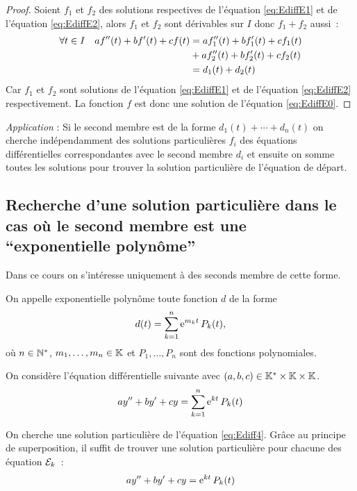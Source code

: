\begin{proof}
  Soient \(f_1\) et \(f_2\) des solutions respectives de l'équation 
  \eqref{eq:EdiffE1} et de l'équation \eqref{eq:EdiffE2}, alors \(f_1\) et 
  \(f_2\) sont dérivables sur \(I\) donc \(f_1 + f_2\) aussi~:
  \begin{align}
    \forall t \in I \quad af''(t) + bf'(t) + cf(t)& = af_1''(t) + bf_1'(t) + 
    cf_1(t) \notag \\
                                                  &+ af_2''(t) + bf_2'(t) + 
    cf_2(t)\\ & = d_1(t) + d_2(t)
  \end{align}
  Car \(f_1\) et \(f_2\) sont solutions de l'équation \eqref{eq:EdiffE1} et de 
  l'équation \eqref{eq:EdiffE2} respectivement. La fonction \(f\) est donc une 
  solution de l'équation \eqref{eq:EdiffE0}.
\end{proof}

\emph{Application} : Si le second membre est de la forme \(d_1(t)+ \dotsb  + 
d_n(t)\) on cherche indépendamment des solutions particulières \(f_i\) des 
équations différentielles correspondantes avec le second membre \(d_i\) et 
ensuite on somme toutes les solutions pour trouver la solution particulière de 
l'équation de départ.

\subsection{Recherche d'une solution particulière dans le cas où le second 
membre est une ``exponentielle polynôme''}
\label{subsec:recherchesolutionpartexppol}

Dans ce cours on s'intéresse uniquement à des seconds membre de cette forme.

\begin{defdef}
  On appelle exponentielle polynôme toute fonction \(d\) de la forme
  \begin{equation}
    d(t) = \sum_{k = 1}^{n} \operatorname{e}^{m_k t} P_k (t),
  \end{equation}
  où \(n \in \mathbb{N}^*\), \(m_1, \ldots, m_n \in \mathbb{K}\) et \( P_1, \ldots, P_n\) sont 
  des fonctions polynomiales.
\end{defdef}
On considère l'équation différentielle  suivante avec \((a,b,c) \in 
\mathbb{K}^{*}\times\mathbb{K}\times\mathbb{K}\).
\begin{equation}
  \label{eq:Ediff4}
  ay'' + by' + cy = \sum_{k = 1}^{n} \operatorname{e}^{kt} P_k(t)
\end{equation}

On cherche une solution particulière de l'équation \eqref{eq:Ediff4}. Grâce au 
principe de superposition, il suffit de trouver une solution particulière pour 
chacune des équation \(\mathcal{E}_k\)~:
\begin{equation}
  \label{eq:Ediffk}
  ay'' + by' + cy= \operatorname{e}^{kt} P_k(t)
\end{equation}

